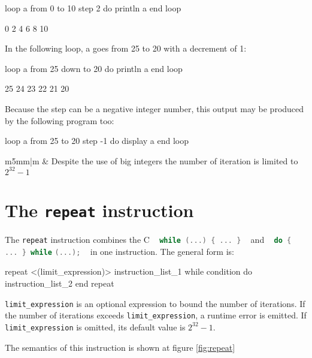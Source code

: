 \documentclass[10pt,openright,twosides,final]{memoir}
\newcommand{\var}[1]{{\small\ttfamily #1}}
\newcommand{\gtlinline}[1]{\colorbox{light-blue}{\lstinline[language=gtl]{#1}}}
\newcommand\Warning{%
 \makebox[1.4em][c]{%
 \makebox[0pt][c]{\raisebox{-.05em}{\scriptsize!}}%
 \makebox[0pt][c]{\raisebox{-.2em}{\color{red}\Large$\bigtriangleup$}}}}%
\newcommand{\warning}[1]{%
\vspace{1em}
\hspace{-18.3mm}
\rowcolors{1}{white}{light-gray}
\begin{tabular}[b]{m{5mm}|m{\linewidth}}
\Warning & #1\\
\end{tabular}
}
\begin{document}
\begin{gtl}
loop a from 0 to 10 step 2 do
  println a
end loop
\end{gtl}

\begin{console}
0
2
4
6
8
10
\end{console}

\noindent In the following loop, \var{a} goes from 25 to 20 with a decrement of 1:

\begin{gtl}
loop a from 25 down to 20 do
  println a
end loop
\end{gtl}

\begin{console}
25
24
23
22
21
20
\end{console}

\noindent Because the step can be a negative integer number, this output may be produced by the following program too:

\begin{gtl}
loop a from 25 to 20 step -1 do
  display a
end loop
\end{gtl}

\warning{Despite the use of big integers the number of iteration is limited to $2^{32}-1$}

\section{The \texttt{repeat} instruction}

The \gtlinline{repeat} instruction combines the C ~ \lstinline[language=C]!while (...) { ... }! ~ and ~ \lstinline[language=C]!do { ... } while! \lstinline[language=C]!(...);! ~ in one instruction. The general form is:

\begin{gtl}
repeat <(limit_expression)>
  instruction_list_1
while condition do
  instruction_list_2
end repeat

\end{gtl}

\gtlinline{limit_expression} is an optional expression to bound the number of iterations. If the number of iterations exceeds \gtlinline{limit_expression}, a runtime error is emitted. If \gtlinline{limit_expression} is omitted, its default value is $2^{32}-1$.

The semantics of this instruction is shown at figure \ref{fig:repeat}
\end{document}
